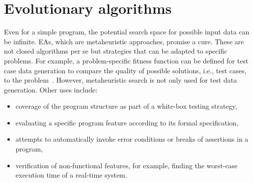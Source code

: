 \documentclass[paper=a4,%
  twoside,%
  BCOR4mm,%
  abstract=true,%
  toc=bibliography,%
  chapterprefix=true,%
  toc=bibliographynumbered,%
  open=right,%
  english,%
  pagesize=pdftex]{scrreprt}
\begin{document}
\section{Evolutionary algorithms}
Even for a simple program, the potential search space for possible input data can be infinite. \acp{EA}, which are metaheuristic approaches, promise a cure. These are not closed algorithms per se but strategies that can be adapted to specific problems. For example, a problem-specific fitness function can be defined for test case data generation to compare the quality of possible solutions, i.e., test cases, to the problem~\cite{McMinn_2004}. However, metaheuristic search is not only used for test data generation. Other uses include:
\begin{itemize}
	\item coverage of the program structure as part of a white-box testing strategy,
	\item evaluating a specific program feature according to its formal specification,
	\item attempts to automatically invoke error conditions or breaks of assertions in a program,
	\item verification of non-functional features, for example, finding the worst-case execution time of a real-time system.
\end{itemize}

\end{document}
